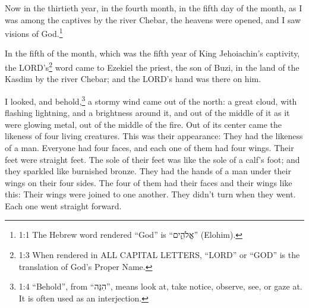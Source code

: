 




\vspace{-1.36in}


\mychapter{} \myverse*{}Now in the thirtieth year, in the fourth month, in the fifth day
of the month, as I was among the captives by the river Chebar, the heavens were opened, and I saw visions
of God.\footnote{1:1 The Hebrew word rendered “God” is “אֱלֹהִ֑ים” (Elohim).}

\myverse{}In the fifth of the month, which was the fifth year of King Jehoiachin’s
captivity,
\myverse{}the LORD’s\footnote{1:3 When rendered in ALL CAPITAL LETTERS, “LORD” or “GOD” is the translation of God’s Proper Name.}
word came to Ezekiel the priest, the son of Buzi, in the land of the Kasdim by the river Chebar; and the
LORD’s hand was there on him.

\myverse{}I looked, and behold,\footnote{1:4 “Behold”, from “הִנֵּה”, means look at, take notice, observe, see, or gaze at. It is
	often used as an interjection.} a stormy wind came out of the north: a great cloud, with flashing
lightning, and a brightness around it, and out of the middle of it as it were glowing metal, out of the
middle of the fire.
\myverse{}Out of its center came the likeness of four living creatures. This was their
appearance: They had the likeness of a man.
\myverse{}Everyone had four faces, and each one of them had four wings.
\myverse{}Their feet were straight feet. The sole of their feet was like the sole of a
calf’s foot; and they sparkled like burnished bronze.
\myverse{}They had the hands of a man under their wings on their four sides. The four
of them had their faces and their wings like this:
\myverse{}Their wings were joined to one another. They didn’t turn when they went. Each
one went straight forward.

